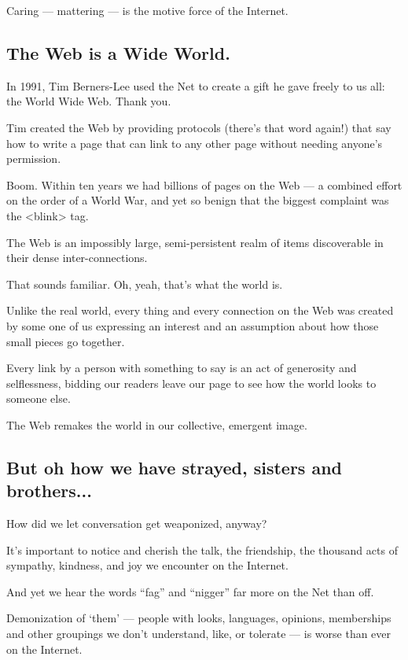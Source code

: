 \documentclass[letterpaper,12pt,english]{sphinxmanual}
\begin{document}
Caring — mattering — is the motive force of the Internet.


\subsection{The Web is a Wide World.}
\label{2015newclues:the-web-is-a-wide-world}
In 1991, Tim Berners-Lee used the Net to create a gift he gave freely to us all: the World Wide Web. Thank you.

Tim created the Web by providing protocols (there's that word again!) that say how to write a page that can link to any other page without needing anyone's permission.

Boom. Within ten years we had billions of pages on the Web — a combined effort on the order of a World War, and yet so benign that the biggest complaint was the \textless{}blink\textgreater{} tag.

The Web is an impossibly large, semi-persistent realm of items discoverable in their dense inter-connections.

That sounds familiar. Oh, yeah, that's what the world is.

Unlike the real world, every thing and every connection on the Web was created by some one of us expressing an interest and an assumption about how those small pieces go together.

Every link by a person with something to say is an act of generosity and selflessness, bidding our readers leave our page to see how the world looks to someone else.

The Web remakes the world in our collective, emergent image.


\subsection{But oh how we have strayed, sisters and brothers...}
\label{2015newclues:but-oh-how-we-have-strayed-sisters-and-brothers}
How did we let conversation get weaponized, anyway?

It's important to notice and cherish the talk, the friendship, the thousand acts of sympathy, kindness, and joy we encounter on the Internet.

And yet we hear the words ``fag'' and ``nigger'' far more on the Net than off.

Demonization of `them' — people with looks, languages, opinions, memberships and other groupings we don't understand, like, or tolerate — is worse than ever on the Internet.
\end{document}
